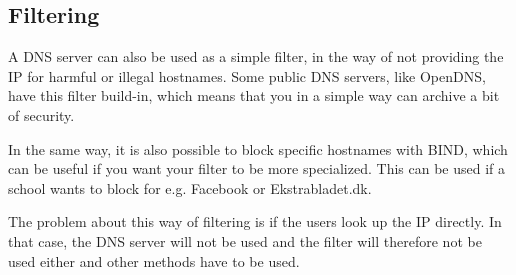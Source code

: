 \documentclass[Preamble]{subfiles}
\begin{document}
\subsection{Filtering}
A DNS server can also be used as a simple filter, in the way of not providing the IP for harmful or illegal hostnames. 
Some public DNS servers, like OpenDNS, have this filter build-in, which means that you in a simple way can archive a bit of security.

In the same way, it is also possible to block specific hostnames with BIND, which can be useful if you want your filter to be more specialized. 
This can be used if a school wants to block for e.g. Facebook or Ekstrabladet.dk.

The problem about this way of filtering is if the users look up the IP directly. 
In that case, the DNS server will not be used and the filter will therefore not be used either and other methods have to be used.
\end{document}
